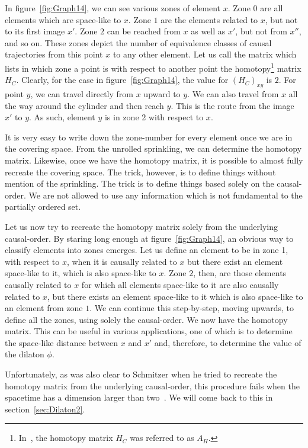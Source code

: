 \documentclass[a4paper,12pt]{article}
\numberwithin{equation}{section}
\begin{document}
In figure~\ref{fig:Graph14}, we can see various zones of element $x$. Zone $0$ are all elements which are space-like to $x$. Zone $1$ are the elements related to $x$, but not to its first image $x'$. Zone $2$ can be reached from $x$ as well as $x'$, but not from $x''$, and so on. These zones depict the number of equivalence classes of causal trajectories from this point $x$ to any other element. Let us call the matrix which lists in which zone a point is with respect to another point the homotopy\footnote{In~\cite{Schmitzer2010}, the homotopy matrix $H_C$ was referred to as $A_H$.} matrix $H_C$. Clearly, for the case in figure~\ref{fig:Graph14}, the value for $(H_{C})_{xy}$ is $2$. For point $y$, we can travel directly from $x$ upward to $y$. We can also travel from $x$ all the way around the cylinder and then reach $y$. This is the route from the image $x'$ to $y$. As such, element $y$ is in zone 2 with respect to $x$.

It is very easy to write down the zone-number for every element once we are in the covering space. From the unrolled sprinkling, we can determine the homotopy matrix. Likewise, once we have the homotopy matrix, it is possible to almost fully recreate the covering space. The trick, however, is to define things without mention of the sprinkling. The trick is to define things based solely on the causal-order. We are not allowed to use any information which is not fundamental to the partially ordered set.

Let us now try to recreate the homotopy matrix solely from the underlying causal-order. By staring long enough at figure~\ref{fig:Graph14}, an obvious way to classify elements into zones emerges. Let us define an element to be in zone 1, with respect to $x$, when it is causally related to $x$ but there exist an element space-like to it, which is also space-like to $x$. Zone $2$, then, are those elements causally related to $x$ for which all elements space-like to it are also causally related to $x$, but there exists an element space-like to it which is also space-like to an element from zone $1$. We can continue this step-by-step, moving upwards, to define all the zones, using solely the causal-order. We now have the homotopy matrix. This can be useful in various applications, one of which is to determine the space-like distance between $x$ and $x'$ and, therefore, to determine the value of the dilaton $\phi$.

Unfortunately, as was also clear to Schmitzer when he tried to recreate the homotopy matrix from the underlying causal-order, this procedure fails when the spacetime has a dimension larger than two~\cite{Schmitzer2010}. We will come back to this in section~\ref{sec:Dilaton2}.
\end{document}
